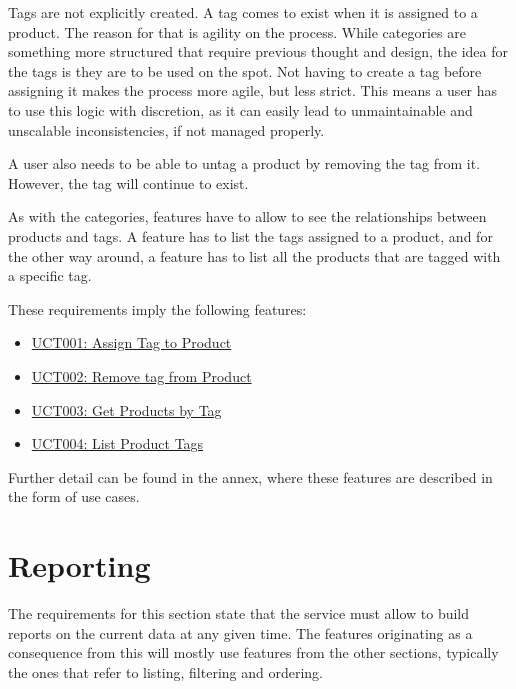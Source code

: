 Tags are not explicitly created. A tag comes to exist when it is assigned to a product. The reason for that is agility on the process. While categories are something more structured that require previous thought and design, the idea for the tags is they are to be used on the spot. Not having to create a tag before assigning it makes the process more agile, but less strict. This means a user has to use this logic with discretion, as it can easily lead to unmaintainable and unscalable inconsistencies, if not managed properly.

A user also needs to be able to untag a product by removing the tag from it. However, the tag will continue to exist.

As with the categories, features have to allow to see the relationships between products and tags. A feature has to list the tags assigned to a product, and for the other way around, a feature has to list all the products that are tagged with a specific tag.

These requirements imply the following features:
\hfill\break
\begin{itemize}
\item \hyperref[UCT001]{UCT001: Assign Tag to Product}
\item \hyperref[UCT002]{UCT002: Remove tag from Product}
\item \hyperref[UCT003]{UCT003: Get Products by Tag}
\item \hyperref[UCT004]{UCT004: List Product Tags}
\end{itemize}
\hfill\break
Further detail can be found in the annex, where these features are described in the form of use cases.

\section{Reporting}
The requirements for this section state that the service must allow to build reports on the current data at any given time. The features originating as a consequence from this will mostly use features from the other sections, typically the ones that refer to listing, filtering and ordering.

